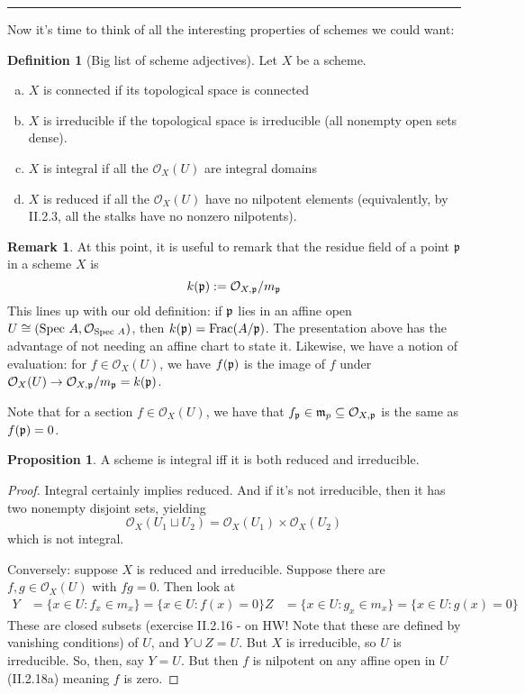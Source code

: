 \documentclass[10pt,reqno]{amsart}
\theoremstyle{definition}
\newtheorem{definition}[theorem]{Definition}
\newtheorem{proposition}[theorem]{Proposition}
\newtheorem{remark}[theorem]{Remark}
\theoremstyle{remark}
\numberwithin{equation}{section}
\numberwithin{theorem}{section}
\newcommand{\OO}{{\mathcal O}}
\newcommand{\spec}{\textup{Spec }}
\newcommand{\pp}{\frak{p}}
\begin{document}
\hrule
\vspace{1em}

Now it's time to think of all the interesting properties of schemes we could want:

\begin{definition}[Big list of scheme adjectives]\label{def:scheme-adj}Let $X$ be a scheme.
\begin{enumerate}[(a)]
\item $X$ is connected if its topological space is connected
\item $X$ is irreducible if the topological space is irreducible (all nonempty open sets dense).
\item $X$ is integral if all the $\OO_X(U)$ are integral domains
\item $X$ is reduced if all the $\OO_X(U)$ have no nilpotent elements (equivalently, by II.2.3, all the stalks have no nonzero nilpotents).
\end{enumerate}
\end{definition}

\begin{remark} At this point, it is useful to remark that the residue field of a point $\pp$ in a scheme $X$ is 
\[k(\pp) := \OO_{X,\pp}/m_{\pp}\]
This lines up with our old definition: if $\pp$ lies in an affine open $U \cong (\spec A,\OO_{\spec A})$, then $k(\pp) = \textup{Frac}(A/\pp)$. The presentation above has the advantage of not needing an affine chart to state it. Likewise, we have a notion of evaluation: for $f \in \OO_X(U)$, we have $f(\pp)$ is the image of $f$ under $\OO_X(U) \to \OO_{X,\pp}/m_{\pp} = k(\pp)$.

Note that for a section $f \in \OO_X(U)$, we have that $f_{\pp} \in \frak{m}_p \subseteq \OO_{X,\pp}$ is the same as $f(\pp) = 0$.
\end{remark}

\begin{proposition} A scheme is integral iff it is both reduced and irreducible.
\end{proposition}
\begin{proof} Integral certainly implies reduced. And if it's not irreducible, then it has two nonempty disjoint sets, yielding
\[\OO_X(U_1 \sqcup U_2) = \OO_X(U_1) \times \OO_X(U_2)\]
which is not integral.

Conversely: suppose $X$ is reduced and irreducible. Suppose there are $f,g \in \OO_X(U)$ with $fg = 0$. Then look at 
\begin{align*}
Y &= \{x \in U: f_x \in m_x\} = \{x \in U: f(x) = 0\}
Z &= \{x \in U: g_x \in m_x\} = \{x \in U: g(x) = 0\}
\end{align*}
These are closed subsets (exercise II.2.16 - on HW! Note that these are defined by vanishing conditions) of $U$, and $Y \cup Z = U$. But $X$ is irreducible, so $U$ is irreducible. So, then, say $Y = U$. But then $f$ is nilpotent on any affine open in $U$ (II.2.18a) meaning $f$ is zero.
\end{proof}
\end{document}
